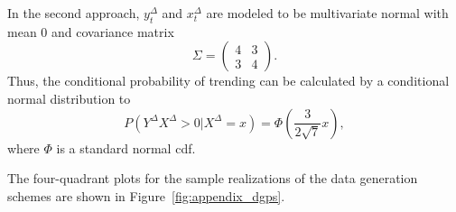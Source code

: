 \documentclass[pdflatex]{sn-jnl}
\theoremstyle{plain}%
\theoremstyle{definition}
\newcommand{\diffxrv}{X^{\Delta}}
\newcommand{\diffyrv}{Y^{\Delta}}
\newcommand{\diffxt}[1][t]{x^{\Delta}_{#1}}
\newcommand{\diffyt}[1][t]{y^{\Delta}_{#1}}
\begin{document}
In the second approach, $\diffyt$ and $\diffxt$ are modeled to be multivariate normal with mean 0 and covariance matrix
\begin{equation*}
    \Sigma = \begin{pmatrix} 4 & 3 \\ 3 & 4 \end{pmatrix}.
\end{equation*}
Thus, the conditional probability of trending can be calculated by a conditional normal distribution to
\begin{equation*}
    P(\diffyrv \diffxrv > 0 | \diffxrv = x) = \Phi \left( \frac{3}{2 \sqrt{7}} x \right),
\end{equation*}
where $\Phi$ is a standard normal \ac{cdf}.

The four-quadrant plots for the sample realizations of the data generation schemes are shown in Figure~\ref{fig:appendix_dgps}.
\end{document}
